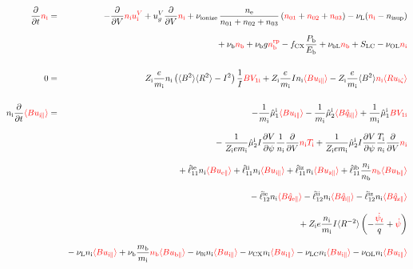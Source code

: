 \documentclass[11pt]{article}
\def\r#1{{\rm#1}}
\def\aves#1{\langle#1\rangle}
\def\dd#1#2{\frac{\partial #1}{\partial #2}}
\def\para{\parallel}
\def\ddV{\frac{\partial}{\partial V}}
\def\ddt{\frac{\partial}{\partial t}}
\def\psid{\dot{\psi}}
\def\psit{\psi_t}
\def\psitd{\dot{\psit}}
\def\mi{m_\r{i}}
\def\mb{m_\r{b}}
\def\nee{n_\r{e}}
\def\ni{n_\r{i}}
\def\nb{n_\r{b}}
\def\Ti{T_\r{i}}
\def\Zi{Z_\r{i}}
\def\uzt#1{u_{\r{#1}\zeta}}
\def\upara#1{u_{\r{#1}\para}}
\def\qhatpara#1{\hat{q}_{\r{#1}\para}}
\def\uV#1{u_\r{#1}^V}
\def\ugV{u_{g}^V}
\def\nun#1{\nu_\r{0#1}}
\def\nsup#1{n_\r{#1sup}}
\def\nbrp{n_\r{b}^\r{rp}}
\def\bri{\aves{B^2}\aves{R^2} - I^2}
\def\Pb{P_\r{b}}
\def\Eb{E_\r{b}}
\def\nna{n_{01}}
\def\nnb{n_{02}}
\def\nnc{n_{03}}
\def\fCX{f_\r{CX}}
\def\nuL{\nu_\r{L}}
\def\nuCX{\nu_\r{CX}}
\def\nuLC{\nu_\r{LC}}
\def\nuion{\nu_\r{ionize}}
\def\nub{\nu_\r{b}}
\def\nuOL{\nu_\r{OL}}
\def\nubL{\nu_\r{bL}}
\def\red#1{\textcolor{red}{#1}}
\begin{document}

%
\begin{eqnarray}
  \ddt \red{\ni} &=&
%
  - \ddV \red{\ni\uV{i}}
%
  + \ugV \ddV \red{\ni}
%
  + \nuion\, \frac{\nee}{\nna + \nnb + \nnc}\, (\red{\nna} +
  \red{\nnb} + \red{\nnc})
%
  - \nuL (\red{\ni} - \nsup{i}) 
\nonumber\\[2.5mm]&&{}
%
  + \nub \red{\nb}
%
  + \nub g \red{\nbrp}
%
  - \fCX \frac{\Pb}{\Eb}
%
  + \nubL \red{\nb}
%
  + S_\r{LC}
%
  - \nuOL \red{\ni}
%
\\[5mm]
  0 &=&
%
    \Zi \frac{e}{\mi} \ni \left( \bri \right) \frac{1}{I} \red{B V_{1\r{i}}}
%
  + \Zi \frac{e}{\mi} I \ni \red{\aves{B\upara{i}}}
%
  - \Zi \frac{e}{\mi} \aves{B^2} \red{\ni \aves{R\uzt{i}}}
\\[5mm]
  \ni \ddt \red{\aves{B \upara{i}}} &=&
%
  - \frac{1}{\mi} \hat{\mu}_1^\r{i} \red{\aves{B \upara{i}}}
  - \frac{1}{\mi} \hat{\mu}_2^\r{i} \red{\aves{B \qhatpara{i}}}
%
  + \frac{1}{\mi} \hat{\mu}_1^\r{i} \red{B V_{1\r{i}}} 
\nonumber\\[3mm]&&{}
%
  - \frac{1}{\Zi e\mi} \hat{\mu}_2^\r{i} I \dd{V}{\psi} \frac{1}{\ni}
  \ddV \red{\ni\Ti}
  + \frac{1}{\Zi e\mi} \hat{\mu}_2^\r{i} I \dd{V}{\psi} \frac{\Ti}{\ni}
  \ddV \red{\ni}
\nonumber\\[3mm]&&{}
%
  + \hat{\ell}_{11}^{\r{ie}} \ni \red{\aves{B \upara{e}}}
  + \hat{\ell}_{11}^{\r{ii}} \ni \red{\aves{B \upara{i}}}
  + \hat{\ell}_{11}^{\r{iz}} \ni \red{\aves{B \upara{z}}}
  + \hat{\ell}_{11}^{\r{ib}} \frac{\ni}{\nb} \red{\nb \aves{B \upara{b}}}
\nonumber\\[3mm]&&{}
%
  - \hat{\ell}_{12}^{\r{ie}} \ni \red{\aves{B \qhatpara{e}}}
  - \hat{\ell}_{12}^{\r{ii}} \ni \red{\aves{B \qhatpara{i}}}
  - \hat{\ell}_{12}^{\r{iz}} \ni \red{\aves{B \qhatpara{z}}}
\nonumber\\[3mm]&&{}
%
  + \Zi e \frac{\ni}{\mi} I \aves{R^{-2}} \left( - \frac{\red{\psitd}}{q} + \red{\psid} \right)
%
%
\nonumber\\[3mm]&&{}
%
  - \nuL  \ni \red{\aves{B \upara{i}}}
%
  + \nub  \frac{\mb}{\mi} \red{\nb \aves{B \upara{b}}}
%
  - \nun{i} \ni \red{\aves{B \upara{i}}}
%
  - \nuCX \ni \red{\aves{B \upara{i}}}
%
  - \nuLC \ni \red{\aves{B \upara{i}}}
%
  - \nuOL \ni \red{\aves{B \upara{i}}}
\nonumber\\[3mm]&&{}

\end{eqnarray}
\end{document}
